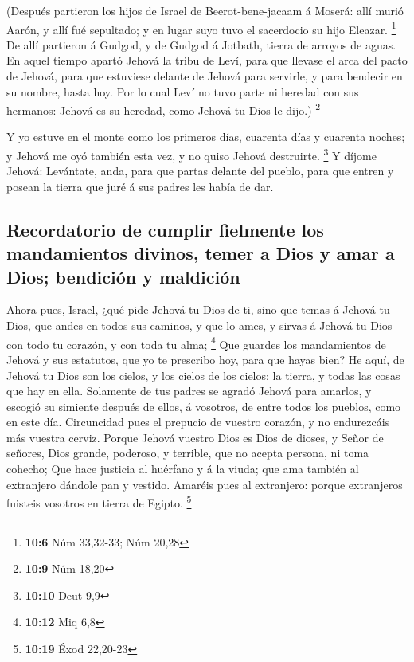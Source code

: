  (Después partieron los hijos de Israel de
Beerot-bene-jacaam á Moserá: allí murió Aarón, y allí fué sepultado; y
en lugar suyo tuvo el sacerdocio su hijo Eleazar. \footnote{\textbf{10:6}
  Núm 33,32-33; Núm 20,28}  De allí partieron á Gudgod, y de
Gudgod á Jotbath, tierra de arroyos de aguas.  En aquel
tiempo apartó Jehová la tribu de Leví, para que llevase el arca del
pacto de Jehová, para que estuviese delante de Jehová para servirle, y
para bendecir en su nombre, hasta hoy.  Por lo cual Leví no
tuvo parte ni heredad con sus hermanos: Jehová es su heredad, como
Jehová tu Dios le dijo.) \footnote{\textbf{10:9} Núm 18,20}

 Y yo estuve en el monte como los primeros días, cuarenta
días y cuarenta noches; y Jehová me oyó también esta vez, y no quiso
Jehová destruirte. \footnote{\textbf{10:10} Deut 9,9}  Y
díjome Jehová: Levántate, anda, para que partas delante del pueblo, para
que entren y posean la tierra que juré á sus padres les había de dar.

\hypertarget{recordatorio-de-cumplir-fielmente-los-mandamientos-divinos-temer-a-dios-y-amar-a-dios-bendiciuxf3n-y-maldiciuxf3n}{%
\subsection{Recordatorio de cumplir fielmente los mandamientos divinos,
temer a Dios y amar a Dios; bendición y
maldición}\label{recordatorio-de-cumplir-fielmente-los-mandamientos-divinos-temer-a-dios-y-amar-a-dios-bendiciuxf3n-y-maldiciuxf3n}}

 Ahora pues, Israel, ¿qué pide Jehová tu Dios de ti, sino
que temas á Jehová tu Dios, que andes en todos sus caminos, y que lo
ames, y sirvas á Jehová tu Dios con todo tu corazón, y con toda tu alma;
\footnote{\textbf{10:12} Miq 6,8}  Que guardes los
mandamientos de Jehová y sus estatutos, que yo te prescribo hoy, para
que hayas bien?  He aquí, de Jehová tu Dios son los cielos,
y los cielos de los cielos: la tierra, y todas las cosas que hay en
ella.  Solamente de tus padres se agradó Jehová para
amarlos, y escogió su simiente después de ellos, á vosotros, de entre
todos los pueblos, como en este día.  Circuncidad pues el
prepucio de vuestro corazón, y no endurezcáis más vuestra cerviz.
 Porque Jehová vuestro Dios es Dios de dioses, y Señor de
señores, Dios grande, poderoso, y terrible, que no acepta persona, ni
toma cohecho;  Que hace justicia al huérfano y á la viuda;
que ama también al extranjero dándole pan y vestido. 
Amaréis pues al extranjero: porque extranjeros fuisteis vosotros en
tierra de Egipto. \footnote{\textbf{10:19} Éxod 22,20-23}

